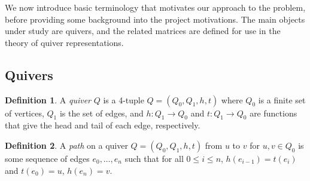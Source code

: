 \documentclass{amsart}
\theoremstyle{theorem}
\theoremstyle{theorem*}
\theoremstyle{definition}
\newtheorem{definition}{Definition}
\begin{document}
We now introduce basic terminology that motivates our approach to the
problem, before providing some background into the project motivations.
The main objects under study are quivers, and the related matrices are
defined for use in the theory of quiver representations.

\subsection{Quivers}

\begin{definition} \cite{dw} A \textit{quiver} $Q$ is a 4-tuple $Q = (Q_0, Q_1,
        h, t)$ where $Q_0$ is a finite set of vertices, $Q_1$ is the set of
    edges, and $h: Q_1 \rightarrow Q_0$ and $t : Q_1 \rightarrow Q_0$ are
    functions that give the head and tail of each edge, respectively.
\end{definition}

\begin{definition} \cite{dw} A \textit{path} on a quiver $Q = (Q_0, Q_1, h, t)$
    from $u$ to $v$ for $u, v \in Q_0$ is some sequence of edges $e_0, \dots,
        e_n$ such that for all $0 \leq i \leq n$, $h(e_{i-1}) = t(e_i)$ and $t(e_0) =
        u$, $h(e_n) = v$.
\end{definition}
\end{document}
